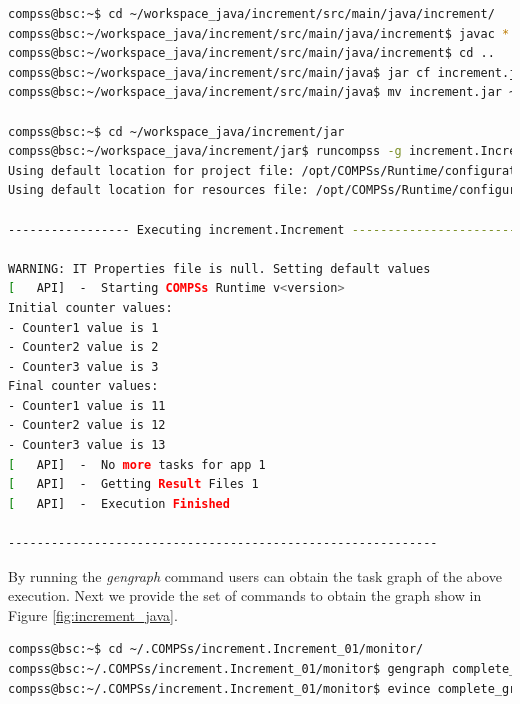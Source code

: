 \begin{lstlisting}[language=bash]
compss@bsc:~$ cd ~/workspace_java/increment/src/main/java/increment/
compss@bsc:~/workspace_java/increment/src/main/java/increment$ javac *.java
compss@bsc:~/workspace_java/increment/src/main/java/increment$ cd ..
compss@bsc:~/workspace_java/increment/src/main/java$ jar cf increment.jar increment
compss@bsc:~/workspace_java/increment/src/main/java$ mv increment.jar ~/workspace_java/increment/jar/

compss@bsc:~$ cd ~/workspace_java/increment/jar
compss@bsc:~/workspace_java/increment/jar$ runcompss -g increment.Increment 10 1 2 3
Using default location for project file: /opt/COMPSs/Runtime/configuration/xml/projects/project.xml
Using default location for resources file: /opt/COMPSs/Runtime/configuration/xml/resources/resources.xml

----------------- Executing increment.Increment --------------------------

WARNING: IT Properties file is null. Setting default values
[   API]  -  Starting COMPSs Runtime v<version>
Initial counter values:
- Counter1 value is 1
- Counter2 value is 2
- Counter3 value is 3
Final counter values:
- Counter1 value is 11
- Counter2 value is 12
- Counter3 value is 13
[   API]  -  No more tasks for app 1
[   API]  -  Getting Result Files 1
[   API]  -  Execution Finished

------------------------------------------------------------
\end{lstlisting}

By running the \textit{gengraph} command users can obtain the task graph of the above execution. Next we provide the set of commands to obtain the
graph show in Figure \ref{fig:increment_java}.

\begin{lstlisting}[language=bash]
compss@bsc:~$ cd ~/.COMPSs/increment.Increment_01/monitor/
compss@bsc:~/.COMPSs/increment.Increment_01/monitor$ gengraph complete_graph.dot
compss@bsc:~/.COMPSs/increment.Increment_01/monitor$ evince complete_graph.pdf
\end{lstlisting}

